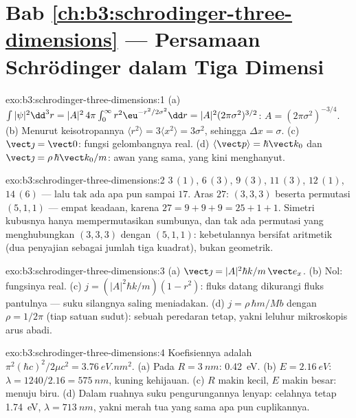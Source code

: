 \section*{Bab \ref{ch:b3:schrodinger-three-dimensions} --- Persamaan Schrödinger dalam Tiga Dimensi}

\begin{solution}{exo:b3:schrodinger-three-dimensions:1}
(a) $\int|\psi|^2\dd^3r = |A|^2\,4\pi\int_0^\infty r^2\eu^{-r^2/2
\sigma^2}\dd r = |A|^2(2\pi\sigma^2)^{3/2}$: $A = (2\pi\sigma^2)^{
-3/4}$. (b) Menurut keisotropannya $\langle r^2\rangle = 3\langle x^2\rangle =
3\sigma^2$, sehingga $\Delta x = \sigma$. (c) $\vect\jmath = \vect 0$:
fungsi gelombangnya real. (d) $\langle\vect p\rangle = \hbar\vect k_0$
dan $\vect\jmath = \rho\,\hbar\vect k_0/m$: awan yang sama, yang kini
menghanyut.
\end{solution}

\begin{solution}{exo:b3:schrodinger-three-dimensions:2}
$3\,(1)$, $6\,(3)$, $9\,(3)$, $11\,(3)$, $12\,(1)$, $14\,(6)$ ---
lalu tak ada apa pun sampai $17$. Aras $27$: $(3,3,3)$ beserta permutasi
$(5,1,1)$ --- empat keadaan, karena $27 = 9+9+9 = 25+1+1$. Simetri
kubusnya hanya mempermutasikan sumbunya, dan tak ada permutasi yang
menghubungkan $(3,3,3)$ dengan $(5,1,1)$: kebetulannya bersifat
aritmetik (dua penyajian sebagai jumlah tiga kuadrat), bukan geometrik.
\end{solution}

\begin{solution}{exo:b3:schrodinger-three-dimensions:3}
(a) $\vect\jmath = |A|^2\hbar k/m\,\vect e_x$. (b) Nol: fungsinya real.
(c) $j = (|A|^2\hbar k/m)(1 - r^2)$: fluks datang dikurangi fluks
pantulnya --- suku silangnya saling meniadakan. (d) $j = \rho\,\hbar
m/Mb$ dengan $\rho = 1/2\pi$ (tiap satuan sudut): sebuah peredaran
tetap, yakni leluhur mikroskopis arus abadi.
\end{solution}

\begin{solution}{exo:b3:schrodinger-three-dimensions:4}
Koefisiennya adalah $\pi^2(\hbar c)^2/2\mu c^2 = \qty{3.76}{eV.nm^2}$.
(a) Pada $R = \qty{3}{nm}$: \qty{0.42}{eV}. (b) $E = \qty{2.16}{eV}$:
$\lambda = 1240/2.16 = \qty{575}{nm}$, kuning kehijauan. (c) $R$ makin
kecil, $E$ makin besar: menuju biru. (d) Dalam ruahnya suku
pengurungannya lenyap: celahnya tetap \qty{1.74}{eV}, $\lambda = \qty{713}{nm}$,
yakni merah tua yang sama apa pun cuplikannya.
\end{solution}

